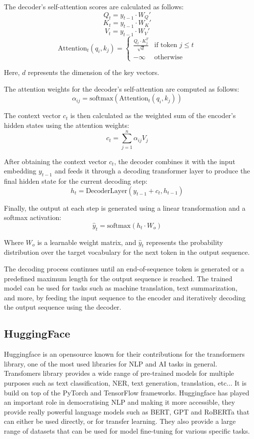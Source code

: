 \documentclass[a4paper,12pt,twoside]{report}
\begin{document}
The decoder's self-attention scores are calculated as follows:
\[
Q_t = y_{t-1} \cdot W_{Q}'
\]
\[
K_t = y_{t-1} \cdot W_{K}'
\]
\[
V_t = y_{t-1} \cdot W_{V}'
\]
\[
\text{Attention}_t(q_i, k_j) = \begin{cases} 
      \frac{{Q_t \cdot K_j^T}}{{\sqrt{d}}} & \text{if token } j \leq t \\
      -\infty & \text{otherwise}
   \end{cases}
\]

Here, $d$ represents the dimension of the key vectors.

The attention weights for the decoder's self-attention are computed as follows:
\[
\alpha_{ij} = \text{softmax}(\text{Attention}_t(q_i, k_j))
\]

The context vector $c_t$ is then calculated as the weighted sum of the encoder's hidden states using the attention weights:
\[
c_t = \sum_{j=1}^n \alpha_{ij} V_j
\]

After obtaining the context vector $c_t$, the decoder combines it with the input embedding $y_{t-1}$ and feeds it through a decoding transformer layer to produce the final hidden state for the current decoding step:
\[
h_t = \text{DecoderLayer}(y_{t-1} + c_t, h_{t-1})
\]

Finally, the output at each step is generated using a linear transformation and a softmax activation:
\[
\hat{y}_t = \text{softmax}(h_t \cdot W_o)
\]

Where $W_o$ is a learnable weight matrix, and $\hat{y}_t$ represents the probability distribution over the target vocabulary for the next token in the output sequence.

The decoding process continues until an end-of-sequence token is generated or a predefined maximum length for the output sequence is reached. The trained model can be used for tasks such as machine translation, text summarization, and more, by feeding the input sequence to the encoder and iteratively decoding the output sequence using the decoder.
\subsection{HuggingFace}
Huggingface \cite{huggingface} is an opensource known for their contributions for the transformers library, one of the most used libraries for NLP and AI tasks in general. 
Transfomers library provides a wide range of pre-trained models for multiple purposes such as text classification, NER, text generation, translation, etc... It is build on top of the PyTorch and TensorFlow frameworks.
Huggingface has played an important role in democratising NLP and making it more accessible, they provide really powerful language models such as BERT, GPT and RoBERTa that can either be used directly, or for transfer learning. They also provide a large range of datasets that can be used for model fine-tuning for various specific tasks.
\end{document}
